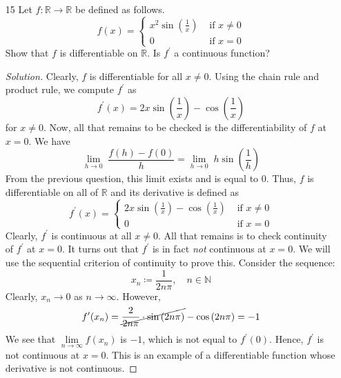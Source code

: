 \documentclass[12pt]{article}
\def\ddfrac#1#2{\displaystyle\frac{\displaystyle #1}{\displaystyle #2}}
\theoremstyle{definition}
\newenvironment{soln}{\begin{proof}[Solution]}{\end{proof}}
\begin{document}
\begin{enumerate}[leftmargin=*]
    \item[15] Let $f \colon \mathbb{R} \rightarrow \mathbb{R}$ be defined as follows. 
    \[
        f(x) = \begin{cases}
            x^2 \sin\left( \ddfrac{1}{x} \right) & \text{ if } x \neq 0 \\
            0 & \text{ if } x=0
        \end{cases}
    \]
    Show that $f$ is differentiable on $\mathbb{R}$. Is $f^{\prime}$ a continuous function?
    \begin{soln}
        Clearly, $f$ is differentiable for all $x \neq 0$. Using the chain rule and product rule, we compute $f^{\prime}$ as 
        \[
            f^{\prime}(x) = 2x \sin\left( \frac{1}{x} \right) - \cos\left( \frac{1}{x} \right)
        \]
        for $x \neq 0$. Now, all that remains to be checked is the differentiability of $f$ at $x=0$. We have
        \[
            \lim_{h \to 0} \; \frac{f(h) - f(0)}{h} = \lim_{h \to 0} \; h \sin{\left( \frac{1}{h}\right)}
        \]
        From the previous question, this limit exists and is equal to $0$. Thus, $f$ is differentiable on all of $\mathbb{R}$ and its derivative is defined as
        \[
            f^{\prime}(x) = \begin{cases}
                2x \sin \left( \ddfrac{1}{x} \right) - \cos \left( \ddfrac{1}{x} \right) & \text{ if } x \neq 0 \\
                0 & \text{ if } x = 0
            \end{cases}
        \]
        Clearly, $f^{\prime}$ is continuous at all $x \neq 0$. All that remains is to check continuity of $f^{\prime}$ at $x=0$. It turns out that $f^{\prime}$ is in fact \textit{not} continuous at $x=0$. We will use the sequential criterion of continuity to prove this. Consider the sequence:
        \[
            x_n \coloneqq \frac{1}{2n\pi}, \quad n \in \mathbb{N}
        \] Clearly, $x_n \to 0$ as $n \to \infty$. However, 
        \[
            f^{\prime}(x_n) = \cancel{\frac{2}{2n\pi} \cdot \sin\left( 2n\pi \right)} - \cos \left( 2n \pi \right) = -1
        \]
        We see that $\lim\limits_{n \to \infty} f(x_n)$ is $-1$, which is not equal to $f^{\prime}(0)$. Hence, $f^{\prime}$ is not continuous at $x=0$. This is an example of a differentiable function whose derivative is not continuous.
    \end{soln}
    
    \newpage 
    

\end{enumerate}
\end{document}

